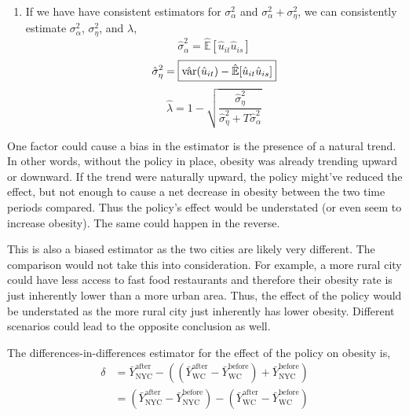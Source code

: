 \documentclass[12pt,twoside]{article}
\begin{document}
\begin{problems}
\begin{problemparts}
\begin{enumerate}[label=\textbf{(\roman*)}]
    \item If we have have consistent estimators for $\sigma_\alpha^2$ and
    $\sigma_\alpha^2 + \sigma_\eta^2$, we can consistently estimate
    $\sigma_\alpha^2$, $\sigma_\eta^2$, and $\lambda$,
    $$ \hat{\sigma}_\alpha^2 = \boxed{\hat{\mathbb{E}}[\hat{u}_{it} \hat{u}_{is}]} $$
    $$ \hat{\sigma}_\eta^2 = \boxed{\hat{\operatorname{var}}(\hat{u}_{it}) -
    \hat{\mathbb{E}}[\hat{u}_{it} \hat{u}_{is}]} $$
    $$ \hat{\lambda} = \boxed{1 -
    \sqrt{\frac{\hat{\sigma}_\eta^2}{\hat{\sigma}_\eta^2 + T
    \hat{\sigma}_\alpha^2}}} $$

\end{enumerate}

\end{problemparts}

\newpage

\problem  %

\begin{problemparts}

\problempart %

One factor could cause a bias in the estimator is the presence of a natural
trend. In other words, without the policy in place, obesity was already
trending upward or downward. If the trend were naturally upward, the policy
might've reduced the effect, but not enough to cause a net decrease in
obesity between the two time periods compared. Thus the policy's effect would
be understated (or even seem to increase obesity). The same could happen in
the reverse.

\problempart %

This is also a biased estimator as the two cities are likely very different.
The comparison would not take this into consideration. For example, a more
rural city could have less access to fast food restaurants and therefore
their obesity rate is just inherently lower than a more urban area. Thus, the
effect of the policy would be understated as the more rural city just
inherently has lower obesity. Different scenarios could lead to the opposite
conclusion as well.

\problempart %

The differences-in-differences estimator for the effect of the policy on
obesity is,
\begin{align*}
    \delta &= \bar{Y}_{\mathrm{NYC}}^{\mathrm{after}} -
    \left(\left(\bar{Y}_{\mathrm{WC}}^{\mathrm{after}} -
    \bar{Y}_{\mathrm{WC}}^{\mathrm{before}}\right) +
    \bar{Y}_{\mathrm{NYC}}^{\mathrm{before}}\right) \\
    &= \boxed{\left(\bar{Y}_{\mathrm{NYC}}^{\mathrm{after}}
    -\bar{Y}_{\mathrm{NYC}}^{\mathrm{before}}\right) -
    \left(\bar{Y}_{\mathrm{WC}}^{\mathrm{after}} -
    \bar{Y}_{\mathrm{WC}}^{\mathrm{before}}\right)}
\end{align*}


\end{problemparts}
\end{problems}
\end{document}
